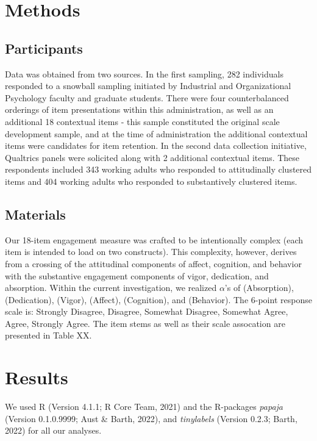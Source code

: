 \documentclass[
  man]{apa7}
\begin{document}
\hypertarget{methods}{%
\section{Methods}\label{methods}}

\hypertarget{participants}{%
\subsection{Participants}\label{participants}}

Data was obtained from two sources. In the first sampling, 282 individuals responded to a snowball sampling initiated by Industrial and Organizational Psychology faculty and graduate students. There were four counterbalanced orderings of item presentations within this administration, as well as an additional 18 contextual items - this sample constituted the original scale development sample, and at the time of administration the additional contextual items were candidates for item retention. In the second data collection initiative, Qualtrics panels were solicited along with 2 additional contextual items. These respondents included 343 working adults who responded to attitudinally clustered items and 404 working adults who responded to substantively clustered items.

\hypertarget{materials}{%
\subsection{Materials}\label{materials}}

Our 18-item engagement measure was crafted to be intentionally complex (each item is intended to load on two constructs). This complexity, however, derives from a crossing of the attitudinal components of affect, cognition, and behavior with the substantive engagement components of vigor, dedication, and absorption. Within the current investigation, we realized \(\alpha\)'s of (Absorption), (Dedication), (Vigor), (Affect), (Cognition), and (Behavior). The 6-point response scale is: Strongly Disagree, Disagree, Somewhat Disagree, Somewhat Agree, Agree, Strongly Agree. The item stems as well as their scale assocation are presented in Table XX.

\hypertarget{results}{%
\section{Results}\label{results}}

We used R (Version 4.1.1; R Core Team, 2021) and the R-packages \emph{papaja} (Version 0.1.0.9999; Aust \& Barth, 2022), and \emph{tinylabels} (Version 0.2.3; Barth, 2022) for all our analyses.
\end{document}
